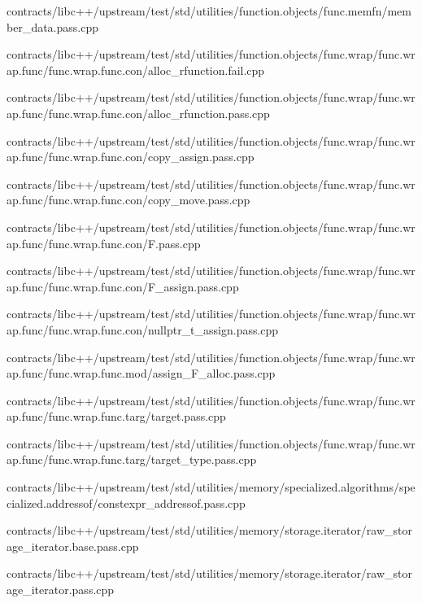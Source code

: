 \begin{DoxyCompactItemize}
contracts/libc++/upstream/test/std/utilities/function.\+objects/func.\+memfn/member\+\_\+data.\+pass.\+cpp\item 
contracts/libc++/upstream/test/std/utilities/function.\+objects/func.\+wrap/func.\+wrap.\+func/func.\+wrap.\+func.\+con/alloc\+\_\+rfunction.\+fail.\+cpp\item 
contracts/libc++/upstream/test/std/utilities/function.\+objects/func.\+wrap/func.\+wrap.\+func/func.\+wrap.\+func.\+con/alloc\+\_\+rfunction.\+pass.\+cpp\item 
contracts/libc++/upstream/test/std/utilities/function.\+objects/func.\+wrap/func.\+wrap.\+func/func.\+wrap.\+func.\+con/copy\+\_\+assign.\+pass.\+cpp\item 
contracts/libc++/upstream/test/std/utilities/function.\+objects/func.\+wrap/func.\+wrap.\+func/func.\+wrap.\+func.\+con/copy\+\_\+move.\+pass.\+cpp\item 
contracts/libc++/upstream/test/std/utilities/function.\+objects/func.\+wrap/func.\+wrap.\+func/func.\+wrap.\+func.\+con/F.\+pass.\+cpp\item 
contracts/libc++/upstream/test/std/utilities/function.\+objects/func.\+wrap/func.\+wrap.\+func/func.\+wrap.\+func.\+con/F\+\_\+assign.\+pass.\+cpp\item 
contracts/libc++/upstream/test/std/utilities/function.\+objects/func.\+wrap/func.\+wrap.\+func/func.\+wrap.\+func.\+con/nullptr\+\_\+t\+\_\+assign.\+pass.\+cpp\item 
contracts/libc++/upstream/test/std/utilities/function.\+objects/func.\+wrap/func.\+wrap.\+func/func.\+wrap.\+func.\+mod/assign\+\_\+\+F\+\_\+alloc.\+pass.\+cpp\item 
contracts/libc++/upstream/test/std/utilities/function.\+objects/func.\+wrap/func.\+wrap.\+func/func.\+wrap.\+func.\+targ/target.\+pass.\+cpp\item 
contracts/libc++/upstream/test/std/utilities/function.\+objects/func.\+wrap/func.\+wrap.\+func/func.\+wrap.\+func.\+targ/target\+\_\+type.\+pass.\+cpp\item 
contracts/libc++/upstream/test/std/utilities/memory/specialized.\+algorithms/specialized.\+addressof/constexpr\+\_\+addressof.\+pass.\+cpp\item 
contracts/libc++/upstream/test/std/utilities/memory/storage.\+iterator/raw\+\_\+storage\+\_\+iterator.\+base.\+pass.\+cpp\item 
contracts/libc++/upstream/test/std/utilities/memory/storage.\+iterator/raw\+\_\+storage\+\_\+iterator.\+pass.\+cpp\item 

\end{DoxyCompactItemize}
